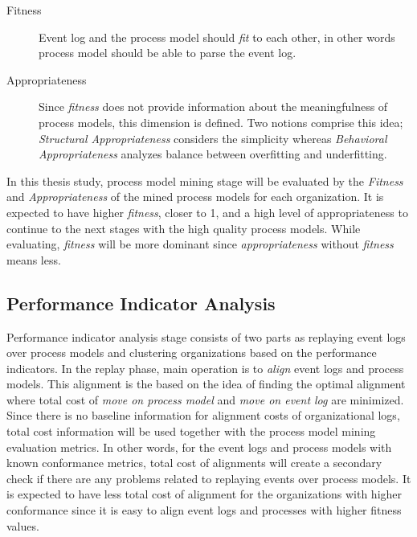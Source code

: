 \begin{description}
  \item[Fitness] Event log and the process model should \textit{fit} to each other, in other words process model should be able to parse the event log. 
  \item[Appropriateness] Since \textit{fitness} does not provide information about the meaningfulness of process models, this dimension is defined. Two notions comprise this idea; \textit{Structural Appropriateness} considers the simplicity whereas \textit{Behavioral Appropriateness} analyzes balance between overfitting and underfitting.
\end{description}

In this thesis study, process model mining stage will be evaluated by the \textit{Fitness} and \textit{Appropriateness} of the mined process models for each organization. It is expected to have higher \textit{fitness}, closer to 1, and a high level of appropriateness to continue to the next stages with the high quality process models. While evaluating, \textit{fitness} will be more dominant since \textit{appropriateness} without \textit{fitness} means less.
\subsection{Performance Indicator Analysis}
\label{subsec:performance-indicator-analysis-eval}
Performance indicator analysis stage consists of two parts as replaying event logs over process models and clustering organizations based on the performance indicators. In the replay phase, main operation is to \textit{align} \cite{van2012replaying} event logs and process models. This alignment is the based on the idea of finding the optimal alignment where total cost of \textit{move on process model} and \textit{move on event log} are minimized. Since there is no baseline information for alignment costs of organizational logs, total cost information will be used together with the process model mining evaluation metrics. In other words, for the event logs and process models with known conformance metrics, total cost of alignments will create a secondary check if there are any problems related to replaying events over process models. It is expected to have less total cost of alignment for the organizations with higher conformance since it is easy to align event logs and processes with higher fitness values.

